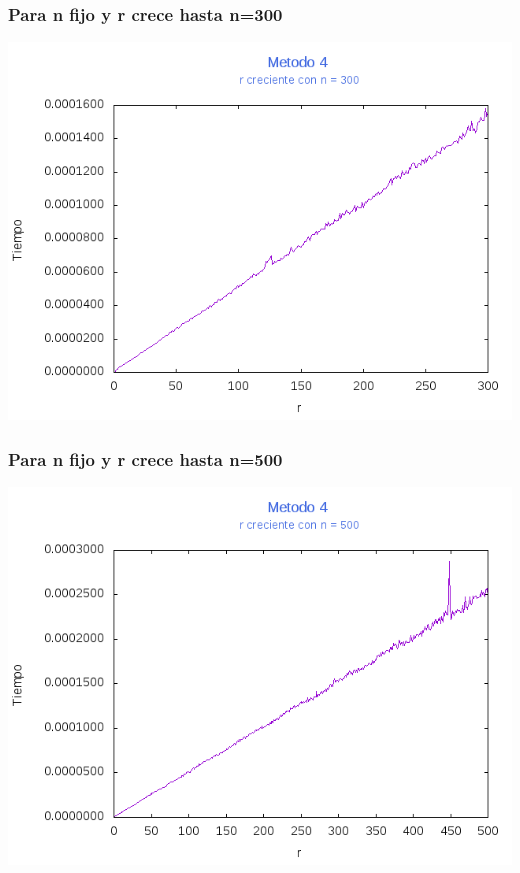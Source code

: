 \documentclass[12pt,letterpaper]{scrartcl}
\begin{document}
\subsubsection{Para n fijo y r crece hasta n=300}
\includegraphics[scale=1]{Metodo4/plot300m4}

\subsubsection{Para n fijo y r crece hasta n=500}
\includegraphics[scale=1]{Metodo4/plot500m4}
\end{document}
